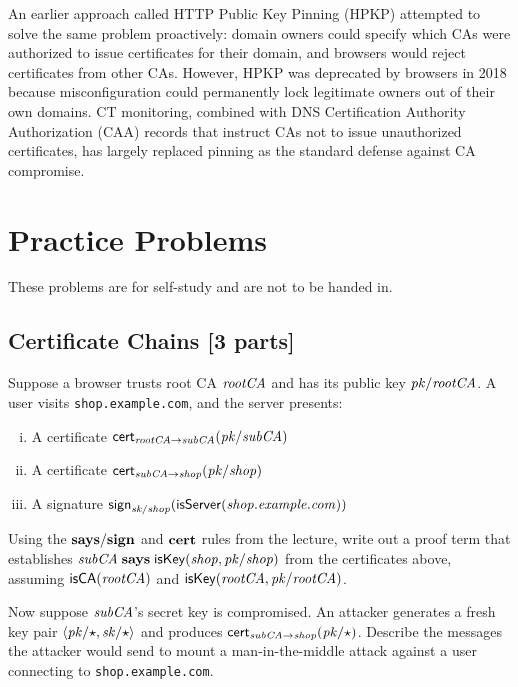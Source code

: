 \documentclass[11pt]{article}
\begin{document}
An earlier approach called HTTP Public Key Pinning (HPKP) attempted to
solve the same problem proactively: domain owners could specify which CAs
were authorized to issue certificates for their domain, and browsers would
reject certificates from other CAs. However, HPKP was deprecated by
browsers in 2018 because misconfiguration could permanently lock
legitimate owners out of their own domains. CT monitoring, combined with
DNS Certification Authority Authorization (CAA) records that instruct CAs
not to issue unauthorized certificates, has largely replaced pinning as
the standard defense against CA compromise.

\section{Practice Problems}

These problems are for self-study and are not to be handed in.

\subsection{Certificate Chains [3 parts]}

Suppose a browser trusts root CA $\mathit{rootCA}$ and has its public key
$\mathit{pk/\mathit{rootCA}}$.  A user visits \verb'shop.example.com', and the server
presents:
\begin{enumerate}[(i)]
\item A certificate $\mathsf{cert}_{{\mathit{rootCA}} \mathbin{\rightarrow} {\mathit{subCA}}}(\mathit{pk/\mathit{subCA}})$
\item A certificate $\mathsf{cert}_{{\mathit{subCA}} \mathbin{\rightarrow} {\mathit{shop}}}(\mathit{pk/\mathit{shop}})$
\item A signature $\mathsf{sign}_{\mathit{sk/\mathit{shop}}}(\mathsf{isServer}(\mathit{shop.example.com}))$
\end{enumerate}

\begin{task}\rm
  Using the $\mathbf{says}/\mathbf{sign}$ and $\mathbf{cert}$ rules from the lecture,
  write out a proof term that establishes
  $\mathit{subCA} \mathrel{\mathbf{says}} \mathsf{isKey}(\mathit{shop}, \mathit{pk/\mathit{shop}})$
  from the certificates above, assuming $\mathsf{isCA}(\mathit{rootCA})$ and
  $\mathsf{isKey}(\mathit{rootCA}, \mathit{pk/\mathit{rootCA}})$.
\end{task}

\begin{task}\rm
  Now suppose $\mathit{subCA}$'s secret key is compromised.  An attacker
  generates a fresh key pair $\langle \mathit{pk/\star}, \mathit{sk/\star} \rangle$
  and produces $\mathsf{cert}_{{\mathit{subCA}} \mathbin{\rightarrow} {\mathit{shop}}}(\mathit{pk/\star})$.  Describe
  the messages the attacker would send to mount a man-in-the-middle
  attack against a user connecting to \verb'shop.example.com'.
\end{task}
\end{document}
